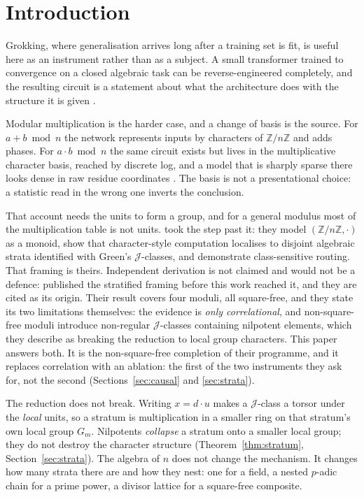 \section{Introduction}
\label{sec:intro}

Grokking, where generalisation arrives long after a training set is fit, is useful here as an
instrument rather than as a subject. A small transformer trained to convergence on a closed
algebraic task can be reverse-engineered completely, and the resulting circuit is a statement
about what the architecture does with the structure it is given
\citep{power2022grokking,nanda2023progress}.

Modular multiplication is the harder case, and a change of basis is the source. For
$a + b \bmod n$ the network represents inputs by characters of $\mathbb{Z}/n\mathbb{Z}$ and
adds phases. For $a \cdot b \bmod n$ the same circuit exists but lives in the multiplicative
character basis, reached by discrete log, and a model that is sharply sparse there looks dense
in raw residue coordinates \citep{nguyen2026dlogclock}. The basis is not a presentational
choice: a statistic read in the wrong one inverts the conclusion.

That account needs the units to form a group, and for a general modulus most of the
multiplication table is not units. \citet{chen2026multiplication} took the step past it: they
model $(\mathbb{Z}/n\mathbb{Z}, \cdot)$ as a monoid, show that character-style computation
localises to disjoint algebraic strata identified with Green's $\mathcal{J}$-classes, and
demonstrate class-sensitive routing. That framing is theirs. Independent derivation is
not claimed and would not be a defence: \citet{chen2026multiplication} published the stratified
framing before this work reached it, and they are cited as its origin. Their result covers four
moduli, all square-free, and they state its two limitations themselves: the evidence is
\emph{only correlational}, and non-square-free moduli introduce non-regular
$\mathcal{J}$-classes containing nilpotent elements, which they describe as breaking the
reduction to local group characters. This paper answers both. It is the non-square-free
completion of their programme, and it replaces correlation with an ablation: the first
of the two instruments they ask for, not the second (Sections~\ref{sec:causal} and
\ref{sec:strata}).

The reduction does not break. Writing $x = d \cdot u$ makes a
$\mathcal{J}$-class a torsor under the \emph{local} units, so a stratum is multiplication
in a smaller ring on that stratum's own local group $G_{m}$. Nilpotents \emph{collapse} a stratum onto a
smaller local group; they do not destroy the character structure
(Theorem~\ref{thm:stratum}, Section~\ref{sec:strata}). The algebra of $n$
does not change the mechanism. It changes how many strata there are and how they nest: one
for a field, a nested $p$-adic chain for a prime power, a divisor lattice for a square-free
composite.

